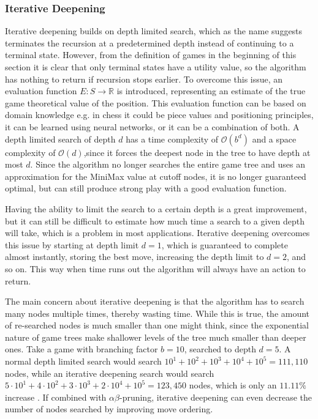\subsubsection{Iterative Deepening}
Iterative deepening builds on depth limited search, which as the name suggests terminates the recursion at a predetermined depth instead of continuing to a terminal state. However, from the definition of games in the beginning of this section it is clear that only terminal states have a utility value, so the algorithm has nothing to return if recursion stops earlier. To overcome this issue, an evaluation function $E: S \rightarrow \mathbb{R}$ is introduced, representing an estimate of the true game theoretical value of the position. This evaluation function can be based on domain knowledge e.g. in chess it could be piece values and positioning principles, it can be learned using neural networks, or it can be a combination of both. A depth limited search of depth $d$ has a time complexity of $\mathcal{O}(b^d)$ and a space complexity of $\mathcal{O}(d)$,since it forces the deepest node in the tree to have depth at most $d$. Since the algorithm no longer searches the entire game tree and uses an approximation for the MiniMax value at cutoff nodes, it is no longer guaranteed optimal, but can still produce strong play with a good evaluation function.

Having the ability to limit the search to a certain depth is a great improvement, but it can still be difficult to estimate how much time a search to a given depth will take, which is a problem in most applications. Iterative deepening overcomes this issue by starting at depth limit $d=1$, which is guaranteed to complete almost instantly, storing the best move, increasing the depth limit to  $d=2$, and so on. This way when time runs out the algorithm will always have an action to return. 

\newpage
The main concern about iterative deepening is that the algorithm has to search many nodes multiple times, thereby wasting time. While this is true, the amount of re-searched nodes is much smaller than one might think, since the exponential nature of game trees make shallower levels of the tree much smaller than deeper ones. Take a game with branching factor $b=10$, searched to depth $d=5$. A normal depth limited search would search $10^1+10^2+10^3+10^4+10^5=111,110$ nodes, while an iterative deepening search would search $5 \cdot 10^1+4 \cdot 10^2+3 \cdot 10^3+2 \cdot 10^4+10^5=123,450$ nodes, which is only an $11.11\%$ increase \cite[p. 99]{russellnorvig}. If combined with $\alpha\beta$-pruning, iterative deepening can even decrease the number of nodes searched by improving move ordering.

